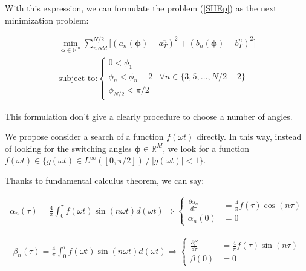 With this expression, we can formulate the problem (\ref{SHEp}) as the next minimization problem:

\begin{problem}\label{SHEp_clas}
    \begin{gather}
        \min_{\bm{\phi} \in \mathbb{R}^m} \sum_{n \ odd}^{N/2}  \Bigg[ (a_n(\bm{\phi}) - a^n_T)^2 +  (b_n(\bm{\phi}) - b^n_T)^2  \Bigg]\\
        \text{subject to:} \begin{cases}
            0 < \phi_1  \\
            \phi_n < \phi_n+2 &  \forall n \in \{3,5,\dots,N/2-2 \}\\
            \phi_{N/2} < \pi/2
        \end{cases}
    \end{gather}     
\end{problem}

This formulation don't give a clearly procedure to choose a number of angles.
\newline

We propose consider a search of a function $f(\omega t)$ directly. In this way, instead of looking for the switching angles $\bm{\phi} \in \mathbb{R}^M$, we look for a function $f(\omega t) \in \{ g(\omega t)  \in L^\infty([0,\pi/2])\ /\ |g(\omega t)| < 1\} $. 

Thanks to fundamental calculus theorem, we can say:

\begin{gather}
    \alpha_n(\tau) = \frac{4}{\pi}\int_0^\tau f(\omega t) \sin(n\omega t)d(\omega t) 
    \Rightarrow
    \begin{cases} \label{ode}
        \frac{\partial \alpha_n}{d\tau} & = \frac{4}{\pi}f(\tau)\cos(n\tau) \\  
        \alpha_n(0) & = 0       
    \end{cases}
\end{gather}

\begin{gather}
    \beta_n(\tau) = \frac{4}{\pi}\int_0^\tau f(\omega t) \sin(n\omega t)d(\omega t) 
    \Rightarrow
    \begin{cases} \label{ode}
        \frac{\partial \beta}{d\tau} & = \frac{4}{\pi}f(\tau)\sin(n\tau) \\  
        \beta(0) & = 0       
    \end{cases}
\end{gather}


